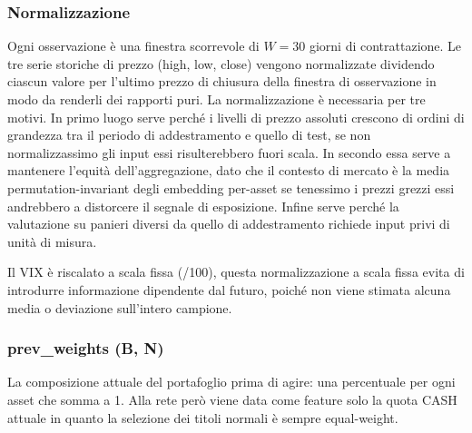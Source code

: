 \subsubsection{Normalizzazione}
Ogni osservazione è una finestra scorrevole di $W=30$ giorni di contrattazione.
Le tre serie storiche di prezzo (high, low, close) vengono normalizzate dividendo
ciascun valore per l’ultimo prezzo di chiusura della finestra di osservazione in modo da renderli dei rapporti puri.
La normalizzazione è necessaria per tre motivi.
In primo luogo serve perché i livelli di prezzo assoluti crescono di ordini di grandezza tra il periodo di addestramento e quello di test, se non normalizzassimo gli input essi risulterebbero fuori scala.
In secondo essa serve a mantenere l'equità dell'aggregazione, dato che il contesto di mercato è la media permutation-invariant degli embedding per-asset se tenessimo i prezzi grezzi essi andrebbero a distorcere il segnale di esposizione.
Infine serve perché la valutazione su panieri diversi da quello di addestramento richiede input privi di unità di misura.

Il VIX è riscalato a scala fissa (/100), questa normalizzazione
a scala fissa evita di introdurre informazione dipendente dal futuro,
poiché non viene stimata alcuna media o deviazione sull’intero campione.

\subsubsection{prev\_weights (B, N)}
La composizione attuale del portafoglio prima di agire: una percentuale per ogni asset che somma a 1. Alla rete però viene data come feature solo la quota CASH attuale in quanto la selezione dei titoli normali è sempre equal-weight.
